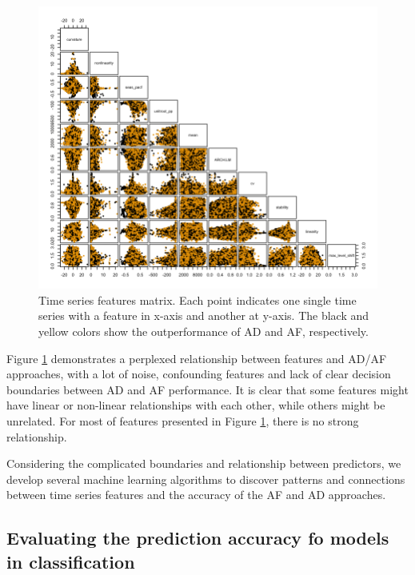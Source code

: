 \documentclass[preprint, 3p,
authoryear]{elsarticle} %
\begin{document}
\begin{figure}[H]

{\centering \includegraphics[width=1\linewidth]{img/300dpi/pair_plot} 

}

\caption{Time series features matrix. Each point indicates one single time series with a feature in x-axis and another at y-axis. The black and yellow colors show the outperformance of AD and AF, respectively.}\label{fig:featuresmatrix}
\end{figure}

Figure \ref{fig:featuresmatrix} demonstrates a perplexed relationship
between features and AD/AF approaches, with a lot of noise, confounding
features and lack of clear decision boundaries between AD and AF
performance. It is clear that some features might have linear or
non-linear relationships with each other, while others might be
unrelated. For most of features presented in Figure
\ref{fig:featuresmatrix}, there is no strong relationship.

Considering the complicated boundaries and relationship between
predictors, we develop several machine learning algorithms to discover
patterns and connections between time series features and the accuracy
of the AF and AD approaches.

\hypertarget{evaluating-the-prediction-accuracy-fo-models-in-classification}{%
\subsection{Evaluating the prediction accuracy fo models in
classification}\label{evaluating-the-prediction-accuracy-fo-models-in-classification}}
\end{document}

